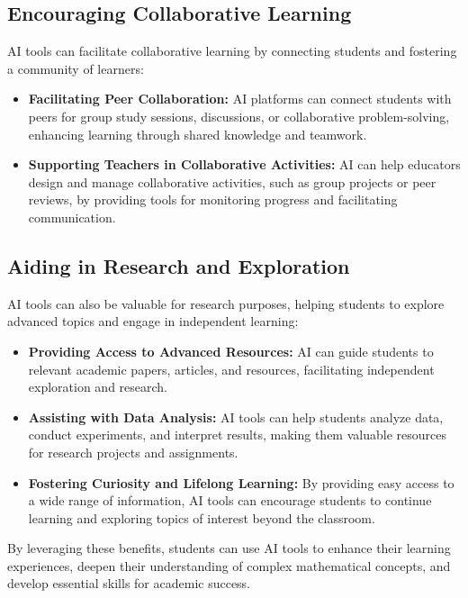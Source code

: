 \documentclass{article}
\begin{document}
\subsection{Encouraging Collaborative Learning}

AI tools can facilitate collaborative learning by connecting students and fostering a community of learners:

\begin{itemize}
    \item \textbf{Facilitating Peer Collaboration:} AI platforms can connect students with peers for group study sessions, discussions, or collaborative problem-solving, enhancing learning through shared knowledge and teamwork.
    \item \textbf{Supporting Teachers in Collaborative Activities:} AI can help educators design and manage collaborative activities, such as group projects or peer reviews, by providing tools for monitoring progress and facilitating communication.
\end{itemize}

\subsection{Aiding in Research and Exploration}

AI tools can also be valuable for research purposes, helping students to explore advanced topics and engage in independent learning:

\begin{itemize}
    \item \textbf{Providing Access to Advanced Resources:} AI can guide students to relevant academic papers, articles, and resources, facilitating independent exploration and research.
    \item \textbf{Assisting with Data Analysis:} AI tools can help students analyze data, conduct experiments, and interpret results, making them valuable resources for research projects and assignments.
    \item \textbf{Fostering Curiosity and Lifelong Learning:} By providing easy access to a wide range of information, AI tools can encourage students to continue learning and exploring topics of interest beyond the classroom.
\end{itemize}

By leveraging these benefits, students can use AI tools to enhance their learning experiences, deepen their understanding of complex mathematical concepts, and develop essential skills for academic success.
\end{document}
